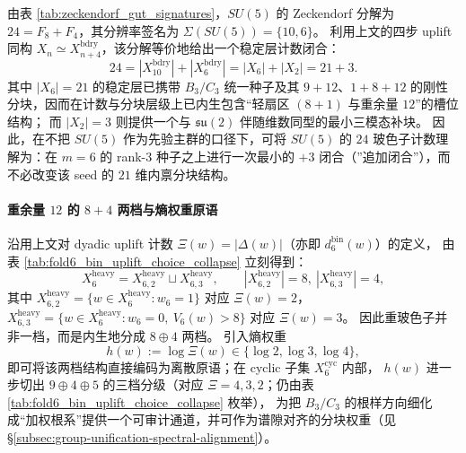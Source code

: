 \begin{corollary}[\texorpdfstring{$SU(5)$}{SU(5)} 的 \(21+3\) 计数闭合：从 \(m=6\) 统一种子到 \(24\) 槽位]\label{cor:su5-21-plus-3-closure}
由表 \ref{tab:zeckendorf_gut_signatures}，\(SU(5)\) 的 Zeckendorf 分解为 \(24=F_8+F_4\)，其分辨率签名为
\(\Sigma(SU(5))=\{10,6\}\)。
利用上文的四步 uplift 同构 \(X_n\simeq X_{n+4}^{\mathrm{bdry}}\)，该分解等价地给出一个稳定层计数闭合：
\[
24=|X^{\mathrm{bdry}}_{10}|+|X^{\mathrm{bdry}}_{6}|=|X_{6}|+|X_{2}|=21+3.
\]
其中 \(|X_6|=21\) 的稳定层已携带 \(B_3/C_3\) 统一种子及其 \(9+12\)、\(1+8+12\) 的刚性分块，因而在计数与分块层级上已内生包含“轻扇区 \((8+1)\) 与重余量 \(12\)”的槽位结构；
而 \(|X_2|=3\) 则提供一个与 \(\mathfrak{su}(2)\) 伴随维数同型的最小三模态补块。
因此，在不把 \(SU(5)\) 作为先验主群的口径下，可将 \(SU(5)\) 的 \(24\) 玻色子计数理解为：在 \(m=6\) 的 rank-\(3\) 种子之上进行一次最小的 \(+3\) 闭合（”追加闭合”），而不必改变该 seed 的 \(21\) 维内禀分块结构。
\end{corollary}

\paragraph{重余量 $12$ 的 $8+4$ 两档与熵权重原语}
沿用上文对 dyadic uplift 计数 \(\Xi(w)=|\Delta(w)|\)（亦即 \(d^{\mathrm{bin}}_6(w)\)）的定义，
由表 \ref{tab:fold6_bin_uplift_choice_collapse} 立刻得到：
\[
X_6^{\mathrm{heavy}}=X_{6,2}^{\mathrm{heavy}}\sqcup X_{6,3}^{\mathrm{heavy}},
\qquad |X_{6,2}^{\mathrm{heavy}}|=8,\ |X_{6,3}^{\mathrm{heavy}}|=4,
\]
其中
\(
X_{6,2}^{\mathrm{heavy}}=\{w\in X_6^{\mathrm{heavy}}:w_6=1\}
\)
对应 \(\Xi(w)=2\)，
\(
X_{6,3}^{\mathrm{heavy}}=\{w\in X_6^{\mathrm{heavy}}:w_6=0,\ V_6(w)>8\}
\)
对应 \(\Xi(w)=3\)。
因此重玻色子并非一档，而是内生地分成 \(8\oplus 4\) 两档。
引入熵权重
\[
h(w):=\log \Xi(w)\in\{\log 2,\log 3,\log 4\},
\]
即可将该两档结构直接编码为离散原语；在 cyclic 子集 \(X_6^{\mathrm{cyc}}\) 内部，
\(h(w)\) 进一步切出 \(9\oplus 4\oplus 5\) 的三档分级（对应 \(\Xi=4,3,2\)；仍由表 \ref{tab:fold6_bin_uplift_choice_collapse} 枚举），
为把 \(B_3/C_3\) 的根样方向细化成“加权根系”提供一个可审计通道，并可作为谱隙对齐的分块权重（见 \S\ref{subsec:group-unification-spectral-alignment}）。

